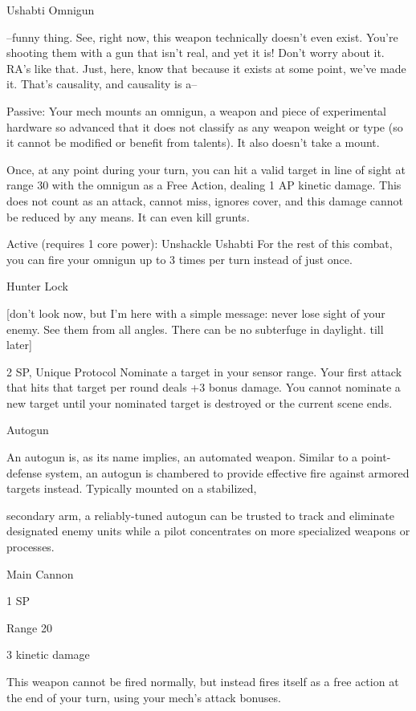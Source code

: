                                                  Ushabti Omnigun

   --funny thing. See, right now, this weapon technically doesn’t even exist. You’re shooting them with a
  gun that isn’t real, and yet it is! Don’t worry about it.  RA’s like that. Just, here, know that because it
  exists at some point, we’ve made it. That’s causality, and causality is a--

  Passive: Your mech mounts an omnigun, a weapon and piece of experimental hardware so advanced
  that it does not classify as any weapon weight or type (so it cannot be modified or benefit from talents).
  It also doesn’t take a mount.

  Once, at any point during your turn, you can hit a valid target in line of sight at range 30 with the
  omnigun as a Free Action, dealing 1 AP kinetic damage. This does not count as an attack, cannot miss,
  ignores cover, and this damage cannot be reduced by any means. It can even kill grunts.

  Active (requires 1 core power): Unshackle Ushabti
  For the rest of this combat, you can fire your omnigun up to 3 times per turn instead of just once.

Hunter Lock

[don’t look now, but I’m here with a simple message: never lose sight of your enemy. See them from all
angles. There can be no subterfuge in daylight. till later]


2 SP, Unique
Protocol
Nominate a target in your sensor range. Your first attack that hits that target per round deals +3
bonus damage. You cannot nominate a new target until your nominated target is destroyed or
the current scene ends.





Autogun

An autogun is, as its name implies, an automated weapon. Similar to a point-defense system, an autogun is
chambered to provide effective fire against armored targets instead. Typically mounted on a stabilized,

secondary arm, a reliably-tuned autogun can be trusted to track and eliminate designated enemy units
while a pilot concentrates on more specialized weapons or processes.

Main Cannon

1 SP

Range 20

3 kinetic damage

This weapon cannot be fired normally, but instead fires itself as a free action at the end of your
turn, using your mech’s attack bonuses.


